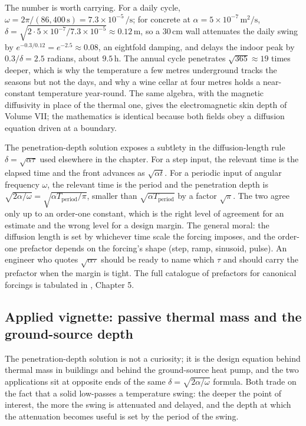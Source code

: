 The number is worth carrying. For a daily cycle, $\omega = 2\pi/
(86{,}400\,\si{\second}) = 7.3 \times 10^{-5}\,\si{\per\second}$;
for concrete at $\alpha = 5 \times 10^{-7}\,\si{\meter\squared\per
\second}$, $\delta = \sqrt{2 \cdot 5 \times 10^{-7}/7.3 \times
10^{-5}} \approx 0.12\,\si{\meter}$, so a $30\,\si{\centi\meter}$
wall attenuates the daily swing by $e^{-0.3/0.12} = e^{-2.5}
\approx 0.08$, an eightfold damping, and delays the indoor peak by
$0.3/\delta = 2.5$ radians, about $9.5\,\si{\hour}$. The annual
cycle penetrates $\sqrt{365} \approx 19$ times deeper, which is why
the temperature a few metres underground tracks the seasons but not
the days, and why a wine cellar at four metres holds a near-constant
temperature year-round. The same algebra, with the magnetic
diffusivity in place of the thermal one, gives the electromagnetic
skin depth of Volume VII; the mathematics is identical because both
fields obey a diffusion equation driven at a boundary.

\begin{mastery}
The penetration-depth solution exposes a subtlety in the
diffusion-length rule $\delta = \sqrt{\alpha\tau}$ used elsewhere
in the chapter. For a step input, the relevant time is the elapsed
time and the front advances as $\sqrt{\alpha t}$. For a periodic
input of angular frequency $\omega$, the relevant time is the
period and the penetration depth is $\sqrt{2\alpha/\omega} =
\sqrt{\alpha T_{\text{period}}/\pi}$, smaller than $\sqrt{\alpha
T_{\text{period}}}$ by a factor $\sqrt{\pi}$. The two agree only up
to an order-one constant, which is the right level of agreement for
an estimate and the wrong level for a design margin. The general
moral: the diffusion length is set by whichever time scale the
forcing imposes, and the order-one prefactor depends on the
forcing's shape (step, ramp, sinusoid, pulse). An engineer who
quotes $\sqrt{\alpha\tau}$ should be ready to name which $\tau$ and
should carry the prefactor when the margin is tight. The full
catalogue of prefactors for canonical forcings is tabulated in
\textcite{text:incropera2007}, Chapter 5.
\end{mastery}

\subsection{Applied vignette: passive thermal mass and the ground-source depth}

The penetration-depth solution is not a curiosity; it is the design
equation behind thermal mass in buildings and behind the ground-source
heat pump, and the two applications sit at opposite ends of the same
$\delta = \sqrt{2\alpha/\omega}$ formula. Both trade on the fact that a
solid low-passes a temperature swing: the deeper the point of interest,
the more the swing is attenuated and delayed, and the depth at which
the attenuation becomes useful is set by the period of the swing.

